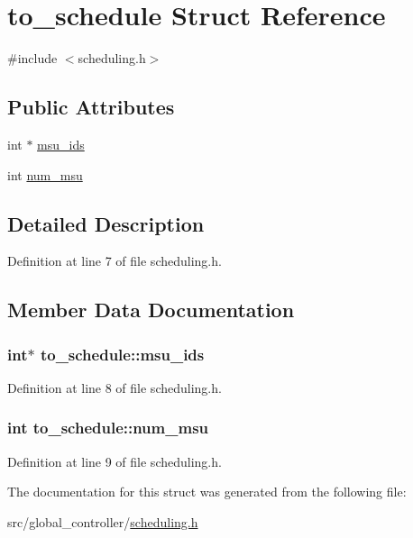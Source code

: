 \hypertarget{structto__schedule}{\section{to\-\_\-schedule Struct Reference}
\label{structto__schedule}
}


{\ttfamily \#include $<$scheduling.\-h$>$}

\subsection*{Public Attributes}
\begin{DoxyCompactItemize}
\item 
int $\ast$ \hyperlink{structto__schedule_af8cd489cdde3677d4953c28d33ab039b}{msu\-\_\-ids}
\item 
int \hyperlink{structto__schedule_a701fee5eb3dee07d7ea2f1a7868e099c}{num\-\_\-msu}
\end{DoxyCompactItemize}


\subsection{Detailed Description}


Definition at line 7 of file scheduling.\-h.



\subsection{Member Data Documentation}
\hypertarget{structto__schedule_af8cd489cdde3677d4953c28d33ab039b}{
\subsubsection[{msu\-\_\-ids}]{\setlength{\rightskip}{0pt plus 5cm}int$\ast$ to\-\_\-schedule\-::msu\-\_\-ids}}\label{structto__schedule_af8cd489cdde3677d4953c28d33ab039b}


Definition at line 8 of file scheduling.\-h.

\hypertarget{structto__schedule_a701fee5eb3dee07d7ea2f1a7868e099c}{
\subsubsection[{num\-\_\-msu}]{\setlength{\rightskip}{0pt plus 5cm}int to\-\_\-schedule\-::num\-\_\-msu}}\label{structto__schedule_a701fee5eb3dee07d7ea2f1a7868e099c}


Definition at line 9 of file scheduling.\-h.



The documentation for this struct was generated from the following file\-:\begin{DoxyCompactItemize}
\item 
src/global\-\_\-controller/\hyperlink{scheduling_8h}{scheduling.\-h}\end{DoxyCompactItemize}
